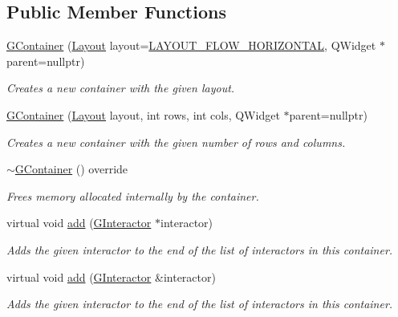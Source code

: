 \subsection*{Public Member Functions}
\begin{DoxyCompactItemize}
\item 
\mbox{\hyperlink{classGContainer_a09fc5a49b2ea0bc895fbf2772c311325}{G\+Container}} (\mbox{\hyperlink{classGContainer_a1b7da28ed84c0763e8f92cde2df4799b}{Layout}} layout=\mbox{\hyperlink{classGContainer_a1b7da28ed84c0763e8f92cde2df4799bac89a811e02b929a18f7f34e7d3bebd63}{L\+A\+Y\+O\+U\+T\+\_\+\+F\+L\+O\+W\+\_\+\+H\+O\+R\+I\+Z\+O\+N\+T\+AL}}, Q\+Widget $\ast$parent=nullptr)
\begin{DoxyCompactList}\small\item\em Creates a new container with the given layout. \end{DoxyCompactList}\item 
\mbox{\hyperlink{classGContainer_a042cb94e18801664efa748e8a8fa74c1}{G\+Container}} (\mbox{\hyperlink{classGContainer_a1b7da28ed84c0763e8f92cde2df4799b}{Layout}} layout, int rows, int cols, Q\+Widget $\ast$parent=nullptr)
\begin{DoxyCompactList}\small\item\em Creates a new container with the given number of rows and columns. \end{DoxyCompactList}\item 
\mbox{\hyperlink{classGContainer_a45b3c0c0cc9c78097c024ca842978692}{$\sim$\+G\+Container}} () override
\begin{DoxyCompactList}\small\item\em Frees memory allocated internally by the container. \end{DoxyCompactList}\item 
virtual void \mbox{\hyperlink{classGContainer_a6f99b7c841256dbdc5acaafbbca4e685}{add}} (\mbox{\hyperlink{classGInteractor}{G\+Interactor}} $\ast$interactor)
\begin{DoxyCompactList}\small\item\em Adds the given interactor to the end of the list of interactors in this container. \end{DoxyCompactList}\item 
virtual void \mbox{\hyperlink{classGContainer_a33b08fe5428ed634a658deab076099f7}{add}} (\mbox{\hyperlink{classGInteractor}{G\+Interactor}} \&interactor)
\begin{DoxyCompactList}\small\item\em Adds the given interactor to the end of the list of interactors in this container. \end{DoxyCompactList}\item 

\end{DoxyCompactItemize}
